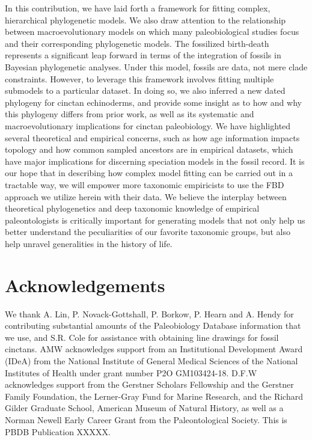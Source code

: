 \documentclass{article}
\begin{document}
In this contribution, we have laid forth a framework for fitting complex, hierarchical phylogenetic models. We also draw attention to the relationship between macroevolutionary models on which many paleobiological studies focus and their corresponding phylogenetic models. 
The fossilized birth-death represents a significant leap forward in terms of the integration of fossils in Bayesian phylogenetic analyses. 
Under this model, fossils are data, not mere clade constraints.
However, to leverage this framework involves fitting multiple submodels to a particular dataset.
In doing so, we also inferred a new dated phylogeny for cinctan echinoderms, and provide some insight as to how and why this phylogeny differs from prior work, as well as its systematic and macroevolutionary implications for cinctan paleobiology.
We have highlighted several theoretical and empirical concerns, such as how age information impacts topology and how common sampled ancestors are in empirical datasets, which have major implications for discerning speciation models in the fossil record.
It is our hope that in describing how complex model fitting can be carried out in a tractable way, we will empower more taxonomic empiricists to use the FBD approach we utilize herein with their data.
We believe the interplay between theoretical phylogenetics and deep taxonomic knowledge of empirical paleontologists is critically important for generating models that not only help us better understand the peculiarities of our favorite taxonomic groups, but also help unravel generalities in the history of life.


\section{Acknowledgements}
We thank A. Lin, P. Novack-Gottshall, P. Borkow, P. Hearn and A. Hendy for contributing substantial amounts of the Paleobiology Database information that we use, and S.R. Cole for assistance with obtaining line drawings for fossil cinctans. AMW acknowledges  support from an Institutional Development Award (IDeA) from the National Institute of General Medical Sciences of the National Institutes of Health under grant number P2O GM103424-18. D.F.W acknowledges support from the Gerstner Scholars Fellowship and the Gerstner Family Foundation, the Lerner-Gray Fund for Marine Research, and the Richard Gilder Graduate School, American Museum of Natural History, as well as a Norman Newell Early Career Grant from the Paleontological Society.  This is PBDB Publication  XXXXX.


 

\end{document}
